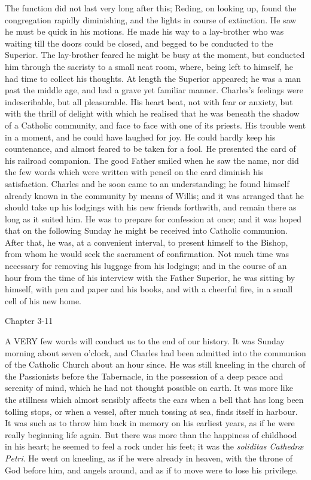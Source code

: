 The function did not last very long after this; Reding, on looking
up, found the congregation rapidly diminishing, and the lights
in course of extinction. He saw he must be quick in his motions. He
made his way to a lay-brother who was waiting till the doors could be
closed, and begged to be conducted to the Superior. The lay-brother
feared he might be busy at the moment, but conducted him through the
sacristy to a small neat room, where, being left to himself, he had
time to collect his thoughts. At length the Superior appeared; he was
a man past the middle age, and had a grave yet familiar manner.
Charles's feelings were indescribable, but all pleasurable. His heart
beat, not with fear or anxiety, but with the thrill of delight with
which he realised that he was beneath the shadow of a Catholic
community, and face to face with one of its priests. His trouble went
in a moment, and he could have laughed for joy. He could hardly keep
his countenance, and almost feared to be taken for a fool. He
presented the card of his railroad companion. The good Father smiled
when he saw the name, nor did the few words which were written with
pencil on the card diminish his satisfaction. Charles and he soon came
to an understanding; he found himself already known in the community
by means of Willis; and it was arranged that he should take up his
lodgings with his new friends forthwith, and remain there as long as
it suited him. He was to prepare for confession at once; and it was
hoped that on the following Sunday he might be received into Catholic
communion. After that, he was, at a convenient interval, to present
himself to the Bishop, from whom he would seek the sacrament of
confirmation. Not much time was necessary for removing his
luggage from his lodgings; and in the course of an hour from the time
of his interview with the Father Superior, he was sitting by himself,
with pen and paper and his books, and with a cheerful fire, in a small
cell of his new home.

Chapter 3-11


A VERY few words will conduct us to the
end of our history. It was Sunday morning about seven o'clock, and
Charles had been admitted into the communion of the Catholic Church
about an hour since. He was still kneeling in the church of the
Passionists before the Tabernacle, in the possession of a deep peace
and serenity of mind, which he had not thought possible on earth. It
was more like the stillness which almost sensibly affects the ears
when a bell that has long been tolling stops, or when a vessel, after
much tossing at sea, finds itself in harbour. It was such as to throw
him back in memory on his earliest years, as if he were really
beginning life again. But there was more than the happiness of
childhood in his heart; he seemed to feel a rock under his feet; it
was the \emph{soliditas Cathedræ Petri}. He went on kneeling, as if
he were already in heaven, with the throne of God before him, and
angels around, and as if to move were to lose his privilege.

